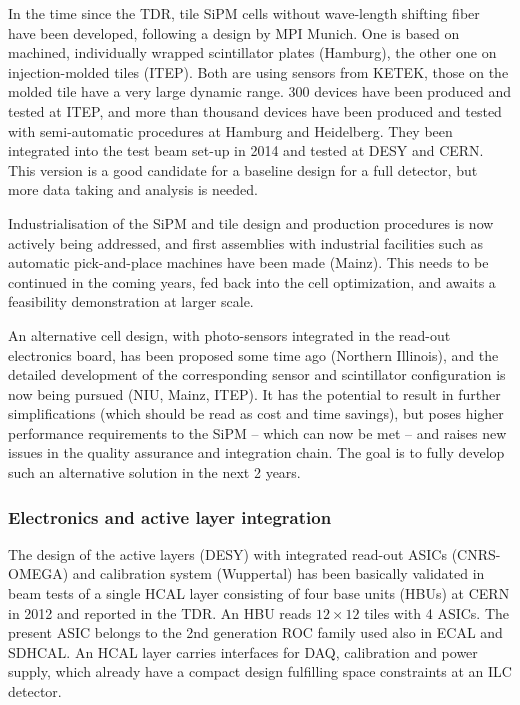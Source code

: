 In the time since the TDR, tile SiPM cells without wave-length shifting fiber have been developed, following a design by MPI Munich. One is based on machined, individually wrapped scintillator plates (Hamburg), the other one on injection-molded tiles (ITEP). Both are using sensors from KETEK, those on the molded tile have a very large dynamic range. 300 devices have been produced and tested at ITEP, and more than thousand devices have been produced and tested with semi-automatic procedures at Hamburg and Heidelberg. They been integrated into the test beam set-up in 2014 and tested at DESY and CERN.  This version is a good candidate for a baseline design for a full detector, but more data taking and analysis is needed.

Industrialisation of the SiPM and tile design and production procedures is now actively being addressed, and first assemblies with industrial facilities such as automatic pick-and-place machines have been made (Mainz). This needs to be continued in the coming years, fed back into the cell optimization, and awaits a feasibility demonstration at larger scale.

An alternative cell design, with photo-sensors integrated in the read-out electronics board, has been proposed some time ago (Northern Illinois), and the detailed development of the corresponding sensor and scintillator configuration is now being pursued  (NIU, Mainz, ITEP). It has the potential to result in further simplifications (which should be read as cost and time savings), but poses higher performance requirements to the SiPM -- which can now be met --  and raises new issues in the quality assurance and integration chain. The goal is to fully develop such an alternative solution in the next 2 years.

\subsubsection{Electronics and active layer integration}

The design of the active layers (DESY) with integrated read-out ASICs (CNRS-OMEGA) and calibration system (Wuppertal) has been basically validated in beam tests of a single HCAL layer consisting of four base units (HBUs) at CERN in 2012 and reported in the TDR. An HBU reads $12 \times 12$ tiles with 4 ASICs. The present ASIC belongs to the 2nd generation ROC family used also in ECAL and SDHCAL. An HCAL layer carries interfaces for DAQ, calibration and power supply, which already have a compact design fulfilling space constraints at an ILC detector.

